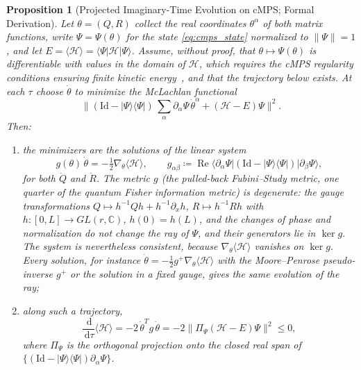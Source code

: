 \documentclass[11pt,a4paper,reqno]{amsart}
\newtheorem{proposition}[theorem]{Proposition}
\theoremstyle{definition}
\numberwithin{equation}{section}
\newcommand{\C}{\mathbb{C}}
\newcommand{\Id}{\mathrm{Id}}
\newcommand{\dif}{\,\mathrm{d}}
\begin{document}
\begin{proposition}[Projected Imaginary-Time Evolution on cMPS; Formal Derivation]
\label{thm:cmps_energy_flow}
Let $\theta = (Q, R)$ collect the real coordinates $\theta^\alpha$ of both matrix functions, write $\Psi = \Psi(\theta)$ for the state \eqref{eq:cmps_state} normalized to $\|\Psi\| = 1$, and let $E = \langle \mathcal{H} \rangle = \langle \Psi | \mathcal{H} | \Psi \rangle$. Assume, without proof, that $\theta \mapsto \Psi(\theta)$ is differentiable with values in the domain of $\mathcal{H}$, which requires the cMPS regularity conditions ensuring finite kinetic energy~\cite{haegeman2011tdvp}, and that the trajectory below exists. At each $\tau$ choose $\dot\theta$ to minimize the McLachlan functional~\cite{mclachlan1964variational}
\begin{equation}
    \Big\| (\Id - |\Psi\rangle\langle\Psi|)\, \textstyle\sum_\alpha \partial_\alpha \Psi\, \dot\theta^\alpha + (\mathcal{H} - E) \Psi \Big\|^2 .
\end{equation}
Then:
\begin{enumerate}[label=(\roman*)]
    \item the minimizers are the solutions of the linear system
    \begin{equation}
        \label{eq:cmps_gradient_flow}
        g(\theta)\, \dot\theta = -\tfrac{1}{2} \nabla_\theta \langle \mathcal{H} \rangle, \qquad g_{\alpha\beta} \coloneqq \operatorname{Re} \langle \partial_\alpha \Psi | (\Id - |\Psi\rangle\langle\Psi|) | \partial_\beta \Psi \rangle,
    \end{equation}
    for both $\dot Q$ and $\dot R$. The metric $g$ (the pulled-back Fubini--Study metric, one quarter of the quantum Fisher information metric) is degenerate: the gauge transformations $Q \mapsto h^{-1} Q h + h^{-1} \partial_x h$, $R \mapsto h^{-1} R h$ with $h \colon [0,L] \to GL(r,\C)$, $h(0) = h(L)$, and the changes of phase and normalization do not change the ray of $\Psi$, and their generators lie in $\ker g$. The system is nevertheless consistent, because $\nabla_\theta\langle\mathcal{H}\rangle$ vanishes on $\ker g$. Every solution, for instance $\dot\theta = -\frac12 g^{+} \nabla_\theta \langle \mathcal{H} \rangle$ with the Moore--Penrose pseudo-inverse $g^+$ or the solution in a fixed gauge, gives the same evolution of the ray;
    \item along such a trajectory,
    \begin{equation}
        \frac{\dif}{\dif \tau} \langle \mathcal{H} \rangle = -2\, \dot\theta^T g\, \dot\theta = -2 \big\| \Pi_{\Psi} (\mathcal{H} - E) \Psi \big\|^2 \le 0,
    \end{equation}
    where $\Pi_\Psi$ is the orthogonal projection onto the closed real span of $\{(\Id - |\Psi\rangle\langle\Psi|)\partial_\alpha \Psi\}$.
\end{enumerate}
\end{proposition}
\end{document}
